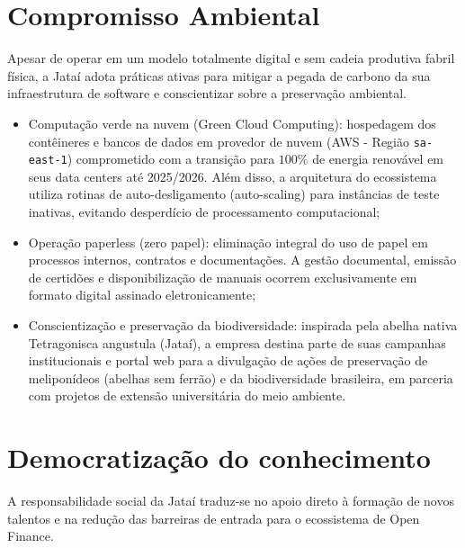 \documentclass[
  12pt,
  openright,
  oneside,
  a4paper,
  brazilian
]{abntex2}
\begin{document}
\section{Compromisso Ambiental}
\label{sec:acoes_ambientais}

Apesar de operar em um modelo totalmente digital e sem cadeia produtiva fabril física, a Jataí adota práticas ativas para mitigar a pegada de carbono da sua infraestrutura de software e conscientizar sobre a preservação ambiental.

\begin{itemize}
    \item{Computação verde na nuvem (Green Cloud Computing):} hospedagem dos contêineres e bancos de dados em provedor de nuvem (AWS - Região \texttt{sa-east-1}) comprometido com a transição para $100\%$ de energia renovável em seus data centers até 2025/2026. Além disso, a arquitetura do ecossistema utiliza rotinas de auto-desligamento (auto-scaling) para instâncias de teste inativas, evitando desperdício de processamento computacional;
    \item{Operação paperless (zero papel):} eliminação integral do uso de papel em processos internos, contratos e documentações. A gestão documental, emissão de certidões e disponibilização de manuais ocorrem exclusivamente em formato digital assinado eletronicamente;
    \item{Conscientização e preservação da biodiversidade:} inspirada pela abelha nativa Tetragonisca angustula (Jataí), a empresa destina parte de suas campanhas institucionais e portal web para a divulgação de ações de preservação de meliponídeos (abelhas sem ferrão) e da biodiversidade brasileira, em parceria com projetos de extensão universitária do meio ambiente.
\end{itemize}

\section{Democratização do conhecimento}
\label{sec:projetos_sociais}

A responsabilidade social da Jataí traduz-se no apoio direto à formação de novos talentos e na redução das barreiras de entrada para o ecossistema de Open Finance.
\end{document}
